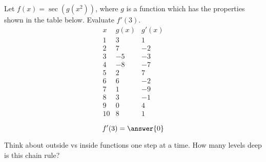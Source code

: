 \documentclass{ximera}
\begin{document}
\begin{exercise}
	Let $f(x) = \sec( g(x^2) )$, where $g$ is a function which has the properties shown in the table below.  Evaluate $f'(3)$.
	\[	\begin{array}{c|c|c}
 			x & g(x) & g'(x)\\ \hline
			1 & 3 & 1\\
			2 & 7 & -2\\
			3 & -5 & -3\\
			4 & -8 & -7\\
			5 & 2 & 7\\
			6 & 6 & -2\\
			7 & 1 & -9\\
			8 & 3 & -1\\
			9 & 0 & 4\\
			10 & 8 & 1\\
		\end{array}
	\]
	\[ f'(3) = \answer{0} \]
	\begin{hint}
		Think about outside vs inside functions one step at a time.  How many levels deep is this chain rule?
	\end{hint}
\end{exercise}
\end{document}
